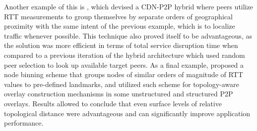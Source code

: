 \begin{itemize}
            Another example of this is \cite{kim2011}, which devised a CDN-P2P hybrid where peers utilize RTT measurements to group themselves by separate orders of geographical proximity with the same intent of the previous example, which is to localize traffic whenever possible.
            This technique also proved itself to be advantageous, as the solution was more efficient in terms of total service disruption time when compared to a previous iteration of the hybrid architecture which used random peer selection to look up available target peers.
            As a final example, \cite{topology-aware-p2p-server-selection} proposed a node binning scheme that groups nodes of similar orders of magnitude of RTT values to pre-defined landmarks, and utilized such scheme for topology-aware overlay construction mechanisms in some unstructured and structured P2P overlays.
            Results allowed to conclude that even surface levels of relative topological distance were advantageous and can significantly improve application performance.


\end{itemize}

